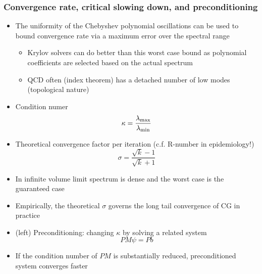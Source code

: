 \documentclass[pdf,ps,8pt]{beamer}
\begin{document}
\begin{frame}[fragile]\small\frametitle{ Convergence rate, critical slowing down, and preconditioning}

\begin{itemize}
\item The uniformity of the Chebyshev polynomial oscillations can be used to bound convergence rate via a maximum error over the spectral range
\begin{itemize}
\item Krylov solvers can do better than this worst case bound as polynomial coefficients are selected based on the actual spectrum
\item QCD often (index theorem) has a detached number of low modes (topological nature)
\end{itemize}
\item Condition numer $$\kappa = \frac{\lambda_{\rm max}}{\lambda_{\rm min}}$$
\item Theoretical convergence factor per iteration (c.f. R-number in epidemiology!)
$$
\sigma = \frac{\sqrt{k}-1}{\sqrt{k}+1}
$$
\item In infinite volume limit spectrum is dense and the worst case is the guaranteed case
\item Empirically, the theoretical $\sigma$ governs the long tail convergence of CG in practice
\item (left) Preconditioning: changing $\kappa$ by solving a related system
$$
 P M \psi = P  b
$$
\item If the condition number of $P M$ is substantially reduced, preconditioned system converges faster
\end{itemize}


\end{frame}
\end{document}
